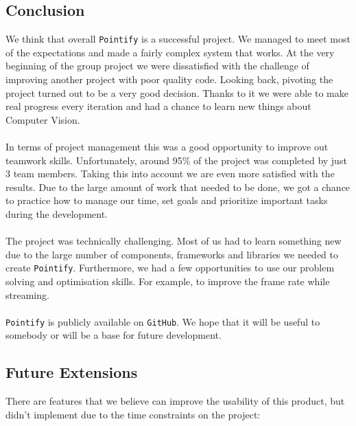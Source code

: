 \documentclass{article}
\begin{document}
\subsection{Conclusion}
We think that overall \texttt{Pointify} is a successful project. We managed to meet most of the expectations and made a fairly complex system that works. At the very beginning of the group project we were dissatisfied with the challenge of improving another project with poor quality code. Looking back, pivoting the project turned out to be a very good decision. Thanks to it we were able to make real progress every iteration and had a chance to learn new things about Computer Vision.
\\
\\
In terms of project management this was a good opportunity to improve out teamwork skills. Unfortunately, around 95\% of the project was completed by just 3 team members.
Taking this into account we are even more satisfied with the results. Due to the large amount of work that needed to be done, we got a chance to practice how to manage our time, set goals and prioritize important tasks during the development.
\\
\\
The project was technically challenging. Most of us had to learn something new due to the large number of components, frameworks and libraries we needed to create \texttt{Pointify}. Furthermore, we had a few opportunities to use our problem solving and optimisation skills. For example, to improve the frame rate while streaming.
\\
\\
\texttt{Pointify} is publicly available on \texttt{GitHub}. We hope that it will be useful to somebody or will be a base for future development. 


\subsection{Future Extensions}
There are features that we believe can improve the usability of this product, but didn't implement due to the time constraints on the project:
\end{document}
